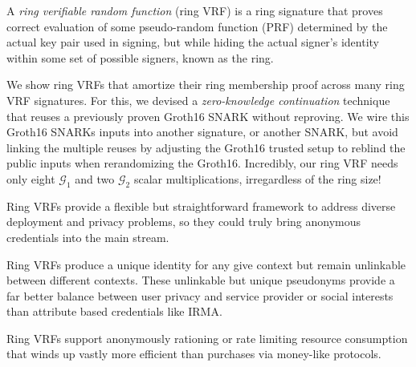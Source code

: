 A {\it ring verifiable random function} (ring VRF) is a ring signature
that proves correct evaluation of some pseudo-random function (PRF)
determined by the actual key pair used in signing, but while hiding
the actual signer's identity within some set of possible signers,
known as the ring.

\smallskip

We show ring VRFs that amortize their ring membership proof across many
ring VRF signatures.
%
For this, we devised a {\em zero-knowledge continuation} technique that
reuses a previously proven Groth16 SNARK without reproving.
We wire this Groth16 SNARKs inputs into another signature, or another SNARK, 
but avoid linking the multiple reuses by adjusting the Groth16 trusted setup
to reblind the public inputs when rerandomizing the Groth16.
%
Incredibly, our ring VRF needs only eight $\mathcal{G}_1$ and two
$\mathcal{G}_2$ scalar multiplications, irregardless of the ring size!

\smallskip

Ring VRFs provide a flexible  but straightforward framework to address
diverse deployment and privacy problems, so they could truly bring
anonymous credentials into the main stream.

Ring VRFs produce a unique identity for any give context but remain
unlinkable between different contexts.  These unlinkable but unique
pseudonyms provide a far better balance between user privacy and service
provider or social interests than attribute based credentials like IRMA.

Ring VRFs support anonymously rationing or rate limiting resource
consumption that winds up vastly more efficient than purchases via
money-like protocols.

